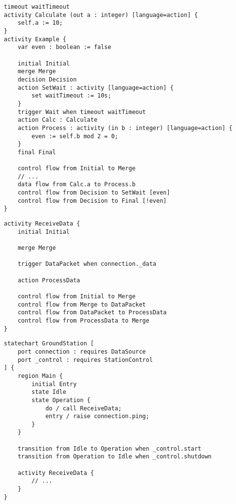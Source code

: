 \begin{lstlisting}[float,language=statechart, caption={The interface model specifying the signals between the two components.},linewidth=0.85\textwidth, xleftmargin=0.15\textwidth]
timeout waitTimeout
activity Calculate (out a : integer) [language=action] {
	self.a := 10;
}
activity Example {
	var even : boolean := false
	
	initial Initial
	merge Merge
	decision Decision
	action SetWait : activity [language=action] {
		set waitTimeout := 10s;
	}
	trigger Wait when timeout waitTimeout
	action Calc : Calculate
	action Process : activity (in b : integer) [language=action] {
		even := self.b mod 2 = 0;
	}
	final Final
	
	control flow from Initial to Merge
	// ...
	data flow from Calc.a to Process.b
	control flow from Decision to SetWait [even]
	control flow from Decision to Final [!even]
}
\end{lstlisting}

\begin{lstlisting}[float,language=statechart, caption={The Gamma implementation of the ReceiveData activity.}]
activity ReceiveData {
	initial Initial
	
	merge Merge
	
	trigger DataPacket when connection._data
	
	action ProcessData
	
	control flow from Initial to Merge
	control flow from Merge to DataPacket
	control flow from DataPacket to ProcessData
	control flow from ProcessData to Merge
}
\end{lstlisting}

\begin{lstlisting}[float,language=statechart, caption={The Gamma implementation of the Ground Station component.}, linewidth=0.80\textwidth, xleftmargin=0.20\textwidth]
statechart GroundStation [
	port connection : requires DataSource
	port _control : requires StationControl
] {
	region Main {
		initial Entry
		state Idle
		state Operation {
			do / call ReceiveData;
			entry / raise connection.ping;
		}
	}
	
	transition from Idle to Operation when _control.start
	transition from Operation to Idle when _control.shutdown
	
	activity ReceiveData {
		// ...
	}
}
\end{lstlisting}

